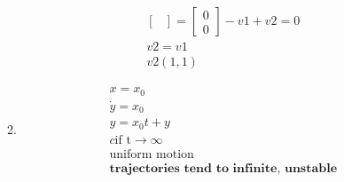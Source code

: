 \documentclass[a4paper,10pt]{article}
\begin{document}
\begin{enumerate}
\begin{enumerate}
\begin{equation}
\begin{aligned}
\begin{bmatrix}
                        \end{bmatrix}
                        = 
                        \begin{bmatrix}
                            0\\
                            0
                        \end{bmatrix}
                        -v1 +v2=0\\
                        v2=v1\\
                        v2(1,1)
                    \end{aligned}
                \end{equation}
            \item
                \begin{equation}
                    \begin{aligned}
                        x=x_{0}\\
                        \dot{y}=x_{0}\\
                        y =x_{0}t + y\\
                       c\text{if t}\to \infty\\
                        \text{uniform motion}\\
                        \textbf{trajectories tend to infinite, unstable}
                    

\end{aligned}
\end{equation}
\end{enumerate}
\end{enumerate}
\end{document}
